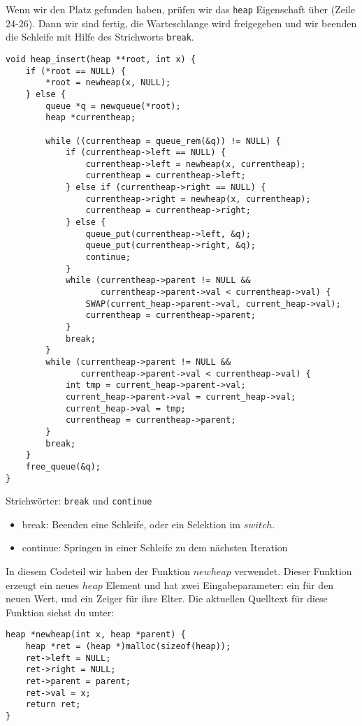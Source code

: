 Wenn wir den Platz gefunden haben, prüfen wir das \texttt{heap} Eigenschaft über
(Zeile 24-26). Dann wir sind fertig, die Warteschlange wird freigegeben und
wir beenden die Schleife mit Hilfe des Strichworts \texttt{break}.
\begin{lstlisting}
void heap_insert(heap **root, int x) {
    if (*root == NULL) {
        *root = newheap(x, NULL);
    } else {
        queue *q = newqueue(*root);
        heap *currentheap;

        while ((currentheap = queue_rem(&q)) != NULL) {
            if (currentheap->left == NULL) {
                currentheap->left = newheap(x, currentheap);
                currentheap = currentheap->left;
            } else if (currentheap->right == NULL) {
                currentheap->right = newheap(x, currentheap);
                currentheap = currentheap->right;
            } else {
                queue_put(currentheap->left, &q);
                queue_put(currentheap->right, &q);
                continue;
            }
            while (currentheap->parent != NULL &&
                   currentheap->parent->val < currentheap->val) {
                SWAP(current_heap->parent->val, current_heap->val);
                currentheap = currentheap->parent;
            }
            break;
        }
        while (currentheap->parent != NULL &&
               currentheap->parent->val < currentheap->val) {
            int tmp = current_heap->parent->val;
            current_heap->parent->val = current_heap->val;
            current_heap->val = tmp;
            currentheap = currentheap->parent;
        }
        break;
    }
    free_queue(&q);
}
\end{lstlisting}
\begin{myexampleblock}{Strichwörter: \texttt{break} und \texttt{continue}}
\begin{itemize}
\item break: Beenden eine Schleife, oder ein Selektion im $switch$.
\item continue: Springen in einer Schleife zu dem nächsten Iteration
\end{itemize}
\end{myexampleblock}
In diesem Codeteil wir haben der Funktion $newheap$ verwendet. Dieser Funktion
erzeugt ein neues $heap$ Element und hat zwei Eingabeparameter: ein für den neuen 
Wert, und ein Zeiger für ihre Elter. Die aktuellen Quelltext für diese Funktion 
siehst du unter:
\begin{lstlisting}
heap *newheap(int x, heap *parent) {
    heap *ret = (heap *)malloc(sizeof(heap));
    ret->left = NULL;
    ret->right = NULL;
    ret->parent = parent;
    ret->val = x;
    return ret;
}
\end{lstlisting}
